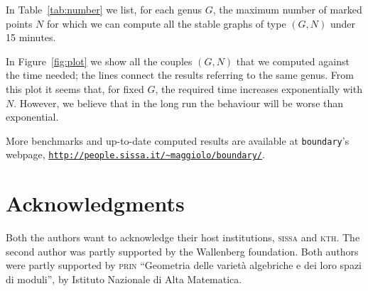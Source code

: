 \documentclass{amsart}
\theoremstyle{plain}
\theoremstyle{definition}
\begin{document}
In Table~\ref{tab:number} we list, for each genus $G$, the maximum
number of marked points $N$ for which we can compute all the stable
graphs of type $(G, N)$ under 15 minutes.

In Figure~\ref{fig:plot} we show all the couples $(G, N)$ that we
computed against the time needed; the lines connect the results
referring to the same genus. From this plot it seems that, for fixed
$G$, the required time increases exponentially with $N$. However, we
believe that in the long run the behaviour will be worse than
exponential.

More benchmarks and up-to-date computed results are available
at \texttt{boundary}'s webpage,
\href{http://people.sissa.it/~maggiolo/boundary/}
{\texttt{http://people.sissa.it/\~{}maggiolo/boundary/}}.

\section*{Acknowledgments}

Both the authors want to acknowledge their host institutions,
\textsc{sissa} and \textsc{kth}.  The second author was partly
supported by the Wallenberg foundation. Both authors were partly
supported by \textsc{prin} ``Geometria delle variet\`a algebriche e
dei loro spazi di moduli'', by Istituto Nazionale di Alta Matematica.
\end{document}
